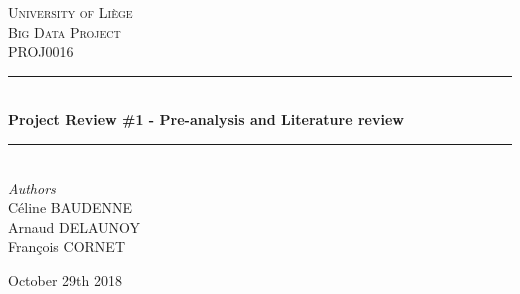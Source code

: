 \documentclass[a4paper,9pt]{report}
\theoremstyle{mytheor}
\begin{document}
\begin{titlepage} %
	\newcommand{\HRule}{\rule{\linewidth}{0.5mm}} %

	\center %


	\textsc{\LARGE University of Liège}\\[1.5cm] %

	\textsc{\Large Big Data Project}\\[0.5cm] %

	\textsc{\large PROJ0016}\\[0.5cm] %


	\HRule\\[0.4cm]

	{\huge\bfseries Project Review \#1 - Pre-analysis and Literature review}\\[0.4cm] %
	\HRule\\[1.5cm]


	{\large\textit{Authors}}\\
  Céline \textsc{BAUDENNE}\\
  Arnaud \textsc{DELAUNOY}\\
	François \textsc{CORNET}



	\vfill\vfill\vfill %

	{\large October 29th 2018} %







	\vfill %

\end{titlepage}
\end{document}
